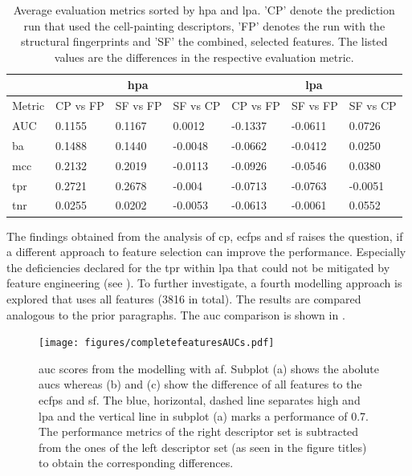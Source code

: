 \begin{table}[H]
	\centering
	\caption[Average Evaluation Metrics Sorted by \acl{hpa} and \acl{lpa}]{Average evaluation metrics sorted by \acl{hpa} and \acl{lpa}. 'CP' denote the prediction run that used the cell-painting descriptors, 'FP' denotes the run with the structural fingerprints and 'SF' the combined, selected features. The listed values are the differences in the respective evaluation metric.}
	\label{tab:avrevalmetrcs}
	\begin{tabular}{l|lll|lll}
		\toprule
		& \multicolumn{3}{|c|}{\acl{hpa}} & \multicolumn{3}{c}{\acl{lpa}} \\
		\midrule
		Metric& CP vs FP & SF vs FP & SF vs CP& CP vs FP & SF vs FP & SF vs CP\\
		\midrule
		AUC &0.1155 & 0.1167 & 0.0012 & -0.1337 & -0.0611 & 0.0726\\
		\ac{ba} &0.1488 & 0.1440 & -0.0048 & -0.0662 & -0.0412 & 0.0250\\
		\ac{mcc} & 0.2132&  0.2019 & -0.0113 & -0.0926 & -0.0546 & 0.0380\\
		\ac{tpr} &0.2721 & 0.2678 & -0.004 & -0.0713 & -0.0763 & -0.0051\\
		\ac{tnr} & 0.0255 & 0.0202 & -0.0053 & -0.0613 & -0.0061 & 0.0552\\
		\bottomrule
	\end{tabular}
\end{table}
The findings obtained from the analysis of \ac{cp}, \ac{ecfp}s and \acl{sf} raises the question, if a different approach to feature selection can improve the performance. Especially the deficiencies declared for the \ac{tpr} within \acl{lpa} that could not be mitigated by feature engineering (see ). To further investigate, a fourth modelling approach is explored that uses all features (3816 in total). The results are compared analogous to the prior paragraphs. The \ac{auc} comparison is shown in . 
\begin{figure}[H]
	\centering
	\texttt{[image: figures/completefeaturesAUCs.pdf]}
	\caption[\ac{auc} Scores from Modelling with All Features]{\ac{auc} scores from the modelling with \acf{af}. Subplot (a) shows the abolute \acp{auc} whereas (b) and (c) show the difference of all features to the \ac{ecfp}s and \acl{sf}. The blue, horizontal, dashed line separates high and \acl{lpa} and the vertical line in subplot (a) marks a performance of \num{0.7}. The performance metrics of the right descriptor set is subtracted from the ones of the left descriptor set (as seen in the figure titles) to obtain the corresponding differences.}
	\label{fig:allfeatauc}
\end{figure}\noindent
